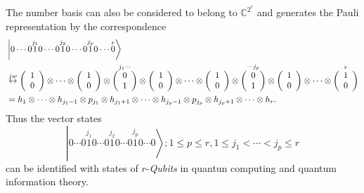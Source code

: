 \documentclass[aps,preprint]{revtex4}%
\begin{document}
The number basis can also be considered to belong to $\mathbb{C}^{2^{r}}$ and
generates the Pauli representation by the correspondence
\begin{align}
&  \left\vert 0\cdots0\overset{j_{1}}{1}0\cdots0\overset{j_{2}}{1}%
0\cdots0\overset{j_{p}}{1}0\cdots\overset{r}{0}\right\rangle \nonumber\\
&  \overset{jw}{\leftrightarrow}\left(
\begin{array}
[c]{c}%
1\\
0
\end{array}
\right)  \otimes\cdots\otimes\left(
\begin{array}
[c]{c}%
1\\
0
\end{array}
\right)  \otimes\overset{j_{1}\cdots}{\left(
\begin{array}
[c]{c}%
0\\
1
\end{array}
\right)  }\otimes\left(
\begin{array}
[c]{c}%
1\\
0
\end{array}
\right)  \otimes\cdots\otimes\left(
\begin{array}
[c]{c}%
1\\
0
\end{array}
\right)  \otimes\overset{\cdots j_{p}}{\left(
\begin{array}
[c]{c}%
0\\
1
\end{array}
\right)  }\otimes\left(
\begin{array}
[c]{c}%
1\\
0
\end{array}
\right)  \otimes\cdots\otimes\overset{r}{\left(
\begin{array}
[c]{c}%
1\\
0
\end{array}
\right)  }\nonumber\\
&  =h_{1}\otimes\cdots\otimes h_{j_{1}-1}\otimes p_{j_{1}}\otimes h_{j_{1}%
+1}\otimes\cdots\otimes h_{j_{p}-1}\otimes p_{j_{p}}\otimes h_{j_{p}+1}%
\otimes\cdots\otimes h_{r}.
\end{align}
Thus the vector states
\begin{equation}
\left\vert 0\cdots0\overset{j_{1}}{1}0\cdots0\overset{j_{2}}{1}0\cdots
0\overset{j_{p}}{1}0\cdots0\right\rangle ;1\leq p\leq r,1\leq j_{1}%
<\cdots<j_{p}\leq r
\end{equation}
can be identified with states of $r$-\emph{Qubits }in quantun computing and
quantum information theory.
\end{document}
